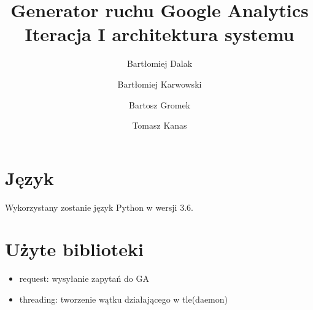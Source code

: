 \documentclass{article}
\title{Generator ruchu Google Analytics \\ Iteracja I architektura systemu}
\author{Bartłomiej Dalak \and Bartłomiej Karwowski \and Bartosz Gromek \and Tomasz Kanas}
\begin{document}
\maketitle

\section{Język}

Wykorzystany zostanie język Python w wersji 3.6.

\section{Użyte biblioteki}

\begin{itemize}
\item request: wysyłanie zapytań do GA
\item threading: tworzenie wątku działającego w tle(daemon)
\end{itemize}
\end{document}
